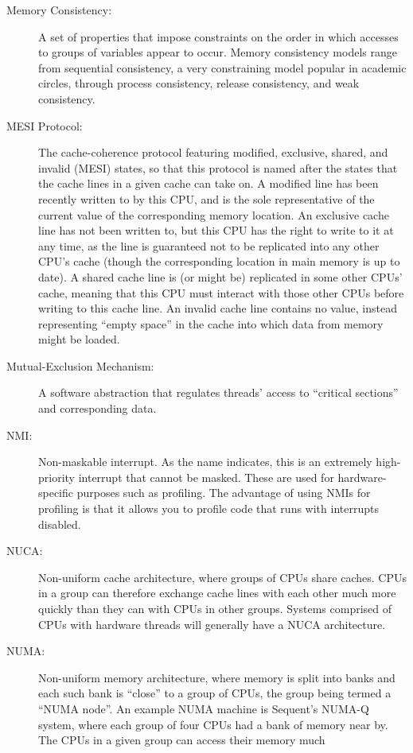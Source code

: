 \begin{description}
\item[Memory Consistency:]
	A set of properties that impose constraints on the order in
	which accesses to groups of variables appear to occur.
	Memory consistency models range from sequential consistency,
	a very constraining model popular in academic circles, through
	process consistency, release consistency, and weak consistency.
\item[MESI Protocol:]
	The
	cache-coherence protocol featuring
	modified, exclusive, shared, and invalid (MESI) states,
	so that this protocol is named after the states that the
	cache lines in a given cache can take on.
	A modified line has been recently written to by this CPU,
	and is the sole representative of the current value of
	the corresponding memory location.
	An exclusive cache line has not been written to, but this
	CPU has the right to write to it at any time, as the line
	is guaranteed not to be replicated into any other CPU's cache
	(though the corresponding location in main memory is up to date).
	A shared cache line is (or might be) replicated in some other
	CPUs' cache, meaning that this CPU must interact with those other
	CPUs before writing to this cache line.
	An invalid cache line contains no value, instead representing
	``empty space'' in the cache into which data from memory might
	be loaded.
\item[Mutual-Exclusion Mechanism:]
	A software abstraction that regulates threads' access to
	``critical sections'' and corresponding data.
\item[NMI:]
	Non-maskable interrupt.
	As the name indicates, this is an extremely high-priority
	interrupt that cannot be masked.
	These are used for hardware-specific purposes such as profiling.
	The advantage of using NMIs for profiling is that it allows you
	to profile code that runs with interrupts disabled.
\item[NUCA:]
	Non-uniform cache architecture, where groups of CPUs share
	caches.
	CPUs in a group can therefore exchange cache lines with each
	other much more quickly than they can with CPUs in other groups.
	Systems comprised of CPUs with hardware threads will generally
	have a NUCA architecture.
\item[NUMA:]
	Non-uniform memory architecture, where memory is split into
	banks and each such bank is ``close'' to a group of CPUs,
	the group being termed a ``NUMA node''.
	An example NUMA machine is Sequent's NUMA-Q system, where
	each group of four CPUs had a bank of memory near by.
	The CPUs in a given group can access their memory much

\end{description}
